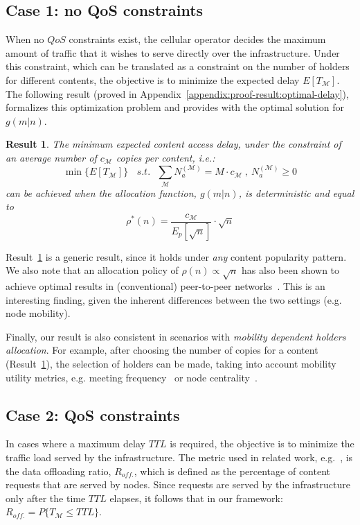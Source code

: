 \documentclass[journal]{IEEEtran}
\newtheorem{result}{Result}
\newcommand{\Na}{N_{a}^{(\mathcal{M})}}
\begin{document}
\subsection{Case 1: no QoS constraints}\label{sec:case-study-ETm}
When no $QoS$ constraints exist, the cellular operator decides the maximum amount of traffic that it wishes to serve directly over the infrastructure. Under this constraint, which can be translated as a constraint on the number of holders for different contents, the objective is to minimize the expected delay $E[T_{\mathcal{M}}]$. The following result (proved in Appendix~\ref{appendix:proof-result:optimal-delay}), formalizes this optimization problem and provides with the optimal solution for $g(m|n)$.

\begin{result}\label{result:optimal-delay}
The minimum expected content access delay, under the constraint of an average number of $c_{\mathcal{M}}$ copies per content, i.e.:
\begin{equation}
 \min\{E[T_{\mathcal{M}}]\}~~~~s.t.~~~\sum_{\mathcal{M}} \Na= M\cdot c_{\mathcal{M}}~,~\Na\geq0\nonumber
\end{equation}
can be achieved when the allocation function, $g(m|n)$, is deterministic and equal to
\begin{equation}\label{eq:optimal-g-delay}
 \rho^{*}(n) = \frac{c_{\mathcal{M}}}{E_{p}[\sqrt{n}]}\cdot \sqrt{n}\nonumber
\end{equation}
\end{result}



Result~\ref{result:optimal-delay} is a generic result, since it holds under \textit{any} content popularity pattern. We also note that an allocation policy of $\rho(n) \propto \sqrt{n}$ has also been shown to achieve optimal results in (conventional) peer-to-peer networks~\cite{replication-p2p}. This is an interesting finding, given the inherent differences between the two settings (e.g. node mobility).

Finally, our result is also consistent in scenarios with \textit{mobility dependent holders allocation}. For example, after choosing the number of copies for a content (Result~\ref{result:optimal-delay}), the selection of holders can be made, taking into account mobility utility metrics, e.g. meeting frequency~\cite{contentplace} or node centrality~\cite{Gao-user-centric-DTN}.



\subsection{Case 2: QoS constraints}\label{sec:case-study-Roff}
In cases where a maximum delay $TTL$ is required, the objective is to minimize the traffic load served by the infrastructure. The metric used in related work, e.g.~\cite{multiple-offloading}, is the data offloading ratio, $R_{off.}$, which is defined as the percentage of content requests that are served by nodes. Since requests are served by the infrastructure only after the time $TTL$ elapses, it follows that in our framework: $ R_{off.} = P\lbrace T_{\mathcal{M}} \leq TTL\rbrace$.
\end{document}
